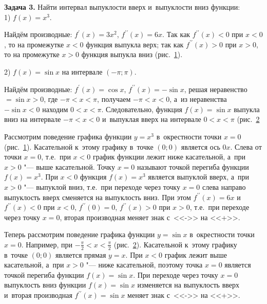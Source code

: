\textbf{Задача 3.}\label{ex:5_6_2_3} Найти интервал выпуклости вверх
и~выпуклости вниз функции:\\
1) $f(x) = x^{3}$.

Найдём производные: $f^\prime (x) = 3x^{2}$, $f^{\prime\prime} (x) = 6x$.
Так как $f^{\prime\prime} (x) < 0$ при $x < 0$, то на промежутке $x < 0$
функция выпукла верх; так как $f^{\prime\prime} (x) > 0$ при $x > 0$,
то на промежутке $x > 0$ функция выпукла вниз (рис.\ \ref{fig:5_6_2_12}).

2) $f(x) = \sin x$ на интервале $(-\pi; \pi)$.

Найдём производные: $f^\prime (x) = \cos x$, $f^{\prime\prime} (x) = -\sin x$,
решая неравенство $=\sin x > 0$, где $-\pi < x < \pi$, получаем $-\pi < x < 0$,
а~из неравенства $-\sin x < 0$ находим $0 < x < \pi$.
Следовательно, функция $f(x) = \sin x$ выпукла вниз на интервале $-\pi < x < 0$
и~выпуклая вверх на интервале $0 < x < \pi$ (рис.\ \ref{fig:5_6_2_13}

\begin{figure}\label{fig:5_6_2_12}
\end{figure}

\begin{figure}\label{fig:5_6_2_13}
\end{figure}

Рассмотрим поведение графика функции $y = x^{3}$ в~окрестности точки $x = 0$
(рис.\ \ref{fig:5_6_2_12}). Касательной к~этому графику в~точке $(0; 0)$
является ось $0x$. Слева от точки $x = 0$, т.е.\ при $x < 0$ график функции лежит
ниже касательной, а~при $x > 0$ "--- выше касательной. Точку $x = 0$ называют
точкой перегиба функции $f(x) = x^{3}$. При $x < 0$ функция $f(x) = x^{3}$ является
выпуклой вверх, а~при $x > 0$ "--- выпуклой вниз, т.е.\ при переходе через точку
$x = 0$ слева направо выпуклость вверх сменяется на выпуклость вниз.
При этом $f^{\prime\prime} (x) = 6x$ и~$f^{\prime\prime} (x) < 0$ при $x < 0$,
$f^{\prime\prime} (0) = 0$, $f^{\prime\prime} (x) > 0$ при $x > 0$,
т.е.\ при переходе через точку $x = 0$, вторая производная меняет знак
с~<<->> на <<+>>.

Теперь рассмотрим поведение графика функции $y = \sin x$ в~окрестности точки $x = 0$.
Например, при $\displaystyle -\frac{\pi}{2} < x < \frac{\pi}{2}$ (рис.\ \ref{fig:5_6_2_13}).
Касательной к~этому графику в~точке $(0; 0)$ является прямая $y = x$.
При $x < 0$ график лежит выше касательной, а~при $x > 0$ "--- ниже касательной,
поэтому точка $x = 0$ является точкой перегиба функции $f(x) = \sin x$.
При переходе через точку $x = 0$ выпуклость вниз функции $f(x) = \sin x$ изменяется
на выпуклость вверх и~вторая производная $f^{\prime\prime} (x) = \sin x$
меняет знак с~<<->> на <<+>>.

